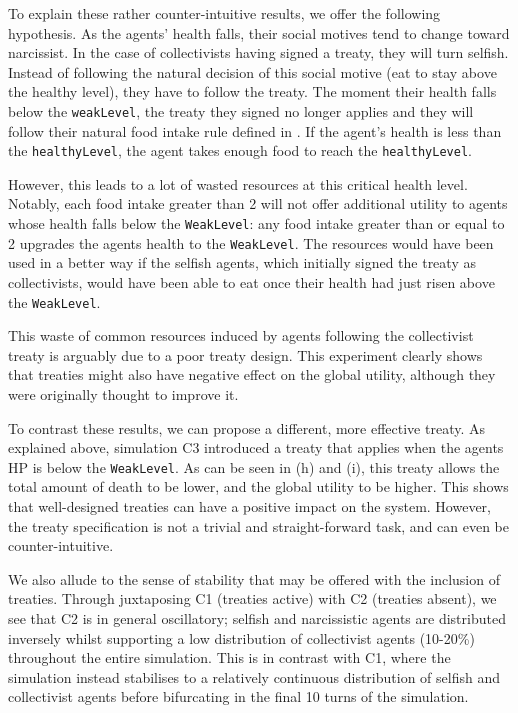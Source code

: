 To explain these rather counter-intuitive results, we offer the following hypothesis. As the agents' health falls, their social motives tend to change toward narcissist. In the case of collectivists having signed a treaty, they will turn selfish. Instead of following the natural decision of this social motive (eat to stay above the healthy level), they have to follow the treaty. The moment their health falls below the \texttt{weakLevel}, the treaty they signed no longer applies and they will follow their natural food intake rule defined in . If the agent's health is less than the \texttt{healthyLevel}, the agent takes enough food to reach the \texttt{healthyLevel}.

However, this leads to a lot of wasted resources at this critical health level. Notably, each food intake greater than 2 will not offer additional utility to agents whose health falls below the \texttt{WeakLevel}: any food intake greater than or equal to 2 upgrades the agents health to the \texttt{WeakLevel}. The resources would have been used in a better way if the selfish agents, which initially signed the treaty as collectivists, would have been able to eat once their health had just risen above the \texttt{WeakLevel}.

This waste of common resources induced by agents following the collectivist treaty is arguably due to a poor treaty design. This experiment clearly shows that treaties might also have negative effect on the global utility, although they were originally thought to improve it.

To contrast these results, we can propose a different, more effective treaty. As explained above, simulation C3 introduced a treaty that applies when the agents HP is below the \texttt{WeakLevel}. As can be seen in  (h) and (i), this treaty allows the total amount of death to be lower, and the global utility to be higher. This shows that well-designed treaties can have a positive impact on the system. However, the treaty specification is not a trivial and straight-forward task, and can even be counter-intuitive.


We also allude to the sense of stability that may be offered with the inclusion of treaties. Through juxtaposing C1 (treaties active) with C2 (treaties absent), we see that C2 is in general oscillatory; selfish and narcissistic agents are distributed inversely whilst supporting a low distribution of collectivist agents (10-20\%) throughout the entire simulation. This is in contrast with C1, where the simulation instead stabilises to a relatively continuous distribution of selfish and collectivist agents before bifurcating in the final 10 turns of the simulation.

